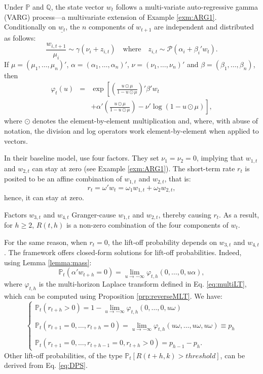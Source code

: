 \documentclass[
  12pt,
]{book}
\theoremstyle{definition}
\theoremstyle{definition}
\theoremstyle{definition}
\theoremstyle{definition}
\theoremstyle{remark}
\begin{document}
Under \(\mathbb{P}\) and \(\mathbb{Q}\), the state vector \(w_t\) follows a multi-variate auto-regressive gamma (VARG) process---a multivariate extension of Example \ref{exm:ARG1}. Conditionally on \(\underline{w_t}\), the \(n\) components of \(w_{t+1}\) are independent and distributed as follows:
\begin{equation}
\frac{w_{i,t+1}}{\mu_i} \sim \gamma(\nu_i+z_{i,t}) \quad \mbox{where} \quad z_{i,t} \sim {\mathcal P} \left( \alpha_i + \beta_i' w_t \right).\label{eq:VARG}
\end{equation}
If \(\mu = (\mu_1,\dots,\mu_n)'\), \(\alpha = (\alpha_1,\dots,\alpha_n)'\), \(\nu = (\nu_1,\dots,\nu_n)'\) and \(\beta = (\beta_1,\dots,\beta_n)\), then
\begin{eqnarray*}
\varphi_t(u) &=& \exp\left[\left(\frac{u \odot \mu}{1 - u \odot \mu}\right)'\beta' w_t \right.\\
&& \left. + \alpha'\left(\frac{u \odot \mu}{1 - u \odot \mu}\right) - \nu'\log(1 - u \odot \mu)\right],
\end{eqnarray*}
where \(\odot\) denotes the element-by-element multiplication and, where, with abuse of notation, the division and log operators work element-by-element when applied to vectors.

In their baseline model, \citet{zarg_2017} use four factors. They set \(\nu_1 = \nu_2 = 0\), implying that \(w_{1,t}\) and \(w_{2,t}\) can stay at zero (see Example \ref{exm:ARG1}). The short-term rate \(r_t\) is posited to be an affine combination of \(w_{1,t}\) and \(w_{2,t}\), that is:
\[
r_t = \omega'w_t = \omega_{1} w_{1,t} + \omega_{2} w_{2,t},
\]
hence, it can stay at zero.

Factors \(w_{3,t}\) and \(w_{4,t}\) Granger-cause \(w_{1,t}\) and \(w_{2,t}\), thereby causing \(r_t\). As a result, for \(h \ge 2\), \(R(t,h)\) is a non-zero combination of the four components of \(w_t\).

For the same reason, when \(r_t=0\), the lift-off probability depends on \(w_{3,t}\) and \(w_{4,t}\). The framework offers closed-form solutions for lift-off probabilities. Indeed, using Lemma \ref{lemma:mass}:
\[
\mathbb{P}_t(\alpha'w_{t+h}=0) = \lim_{u \rightarrow -\infty} \varphi_{t,h}(0,\dots,0,u\alpha),
\]
where \(\varphi_{t,h}\) is the multi-horizon Laplace transform defined in Eq. \eqref{eq:multiLT}, which can be computed using Proposition \ref{prp:reverseMLT}. We have:
\begin{equation}
\left\{
\begin{array}{l}
\mathbb{P}_t(r_{t+h}>0) = 1 - \lim_{u \rightarrow -\infty} \varphi_{t,h}(0,\dots,0,u\omega) \\ \\
\mathbb{P}_t(r_{t+1}=0,\dots,r_{t+h}=0) = \lim_{u \rightarrow -\infty} \varphi_{t,h}(u\omega,\dots,u\omega,u\omega) \equiv p_{h}\\ \\
\mathbb{P}_t(r_{t+1}=0,\dots,r_{t+h-1}=0,r_{t+h}>0) = p_{h-1} - p_h.
\end{array}
\right.
\end{equation}
Other lift-off probabilities, of the type \(\mathbb{P}_t[R(t+h,k)>threshold]\), can be derived from Eq. \eqref{eq:DPS}.
\end{document}
